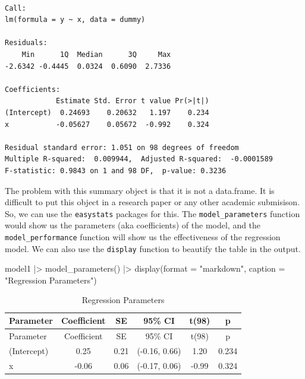 \documentclass[
  letterpaper,
  paper =a4,
  twoside,
  openright,
  headsepline,
  footsepline,
  listof = totocnumbered,
  chapterprefix = true,
  firstiscover]{scrbook}
\newenvironment{Shaded}{\begin{snugshade}}{\end{snugshade}}
\newcommand{\AttributeTok}[1]{\textcolor[rgb]{0.40,0.45,0.13}{#1}}
\newcommand{\FunctionTok}[1]{\textcolor[rgb]{0.28,0.35,0.67}{#1}}
\newcommand{\NormalTok}[1]{\textcolor[rgb]{0.00,0.23,0.31}{#1}}
\newcommand{\SpecialCharTok}[1]{\textcolor[rgb]{0.37,0.37,0.37}{#1}}
\newcommand{\StringTok}[1]{\textcolor[rgb]{0.13,0.47,0.30}{#1}}
\begin{document}
\begin{verbatim}

Call:
lm(formula = y ~ x, data = dummy)

Residuals:
    Min      1Q  Median      3Q     Max 
-2.6342 -0.4445  0.0324  0.6090  2.7336 

Coefficients:
            Estimate Std. Error t value Pr(>|t|)
(Intercept)  0.24693    0.20632   1.197    0.234
x           -0.05627    0.05672  -0.992    0.324

Residual standard error: 1.051 on 98 degrees of freedom
Multiple R-squared:  0.009944,  Adjusted R-squared:  -0.0001589 
F-statistic: 0.9843 on 1 and 98 DF,  p-value: 0.3236
\end{verbatim}

The problem with this summary object is that it is not a data.frame. It
is difficult to put this object in a research paper or any other
academic submisison. So, we can use the \texttt{easystats} packages for
this. The \texttt{model\_parameters} function would show us the
parameters (aka coefficients) of the model, and the
\texttt{model\_performance} function will show us the effectiveness of
the regression model. We can also use the \texttt{display} function to
beautify the table in the output.

\begin{Shaded}
\begin{Highlighting}[numbers=left,,]
\NormalTok{model1 }\SpecialCharTok{|\textgreater{}} \FunctionTok{model\_parameters}\NormalTok{() }\SpecialCharTok{|\textgreater{}} 
  \FunctionTok{display}\NormalTok{(}\AttributeTok{format =} \StringTok{"markdown"}\NormalTok{, }\AttributeTok{caption =} \StringTok{"Regression Parameters"}\NormalTok{)}
\end{Highlighting}
\end{Shaded}

\hypertarget{tbl-regression-params}{}
\begin{longtable}[]{@{}lccccc@{}}
\caption{\label{tbl-regression-params}Regression
Parameters}\tabularnewline
\toprule\noalign{}
Parameter & Coefficient & SE & 95\% CI & t(98) & p \\
\midrule\noalign{}
\endfirsthead
\toprule\noalign{}
Parameter & Coefficient & SE & 95\% CI & t(98) & p \\
\midrule\noalign{}
\endhead
\bottomrule\noalign{}
\endlastfoot
(Intercept) & 0.25 & 0.21 & (-0.16, 0.66) & 1.20 & 0.234 \\
x & -0.06 & 0.06 & (-0.17, 0.06) & -0.99 & 0.324 \\
\end{longtable}
\end{document}
